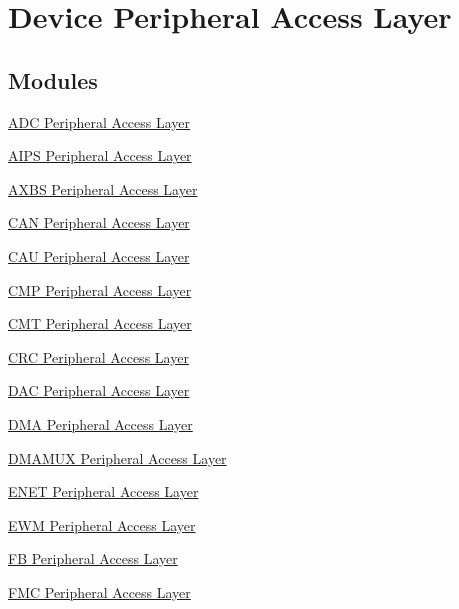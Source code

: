 \hypertarget{group__Peripheral__access__layer}{}\section{Device Peripheral Access Layer}
\label{group__Peripheral__access__layer}
\subsection*{Modules}
\begin{DoxyCompactItemize}
\item 
\hyperlink{group__ADC__Peripheral__Access__Layer}{A\+D\+C Peripheral Access Layer}
\item 
\hyperlink{group__AIPS__Peripheral__Access__Layer}{A\+I\+P\+S Peripheral Access Layer}
\item 
\hyperlink{group__AXBS__Peripheral__Access__Layer}{A\+X\+B\+S Peripheral Access Layer}
\item 
\hyperlink{group__CAN__Peripheral__Access__Layer}{C\+A\+N Peripheral Access Layer}
\item 
\hyperlink{group__CAU__Peripheral__Access__Layer}{C\+A\+U Peripheral Access Layer}
\item 
\hyperlink{group__CMP__Peripheral__Access__Layer}{C\+M\+P Peripheral Access Layer}
\item 
\hyperlink{group__CMT__Peripheral__Access__Layer}{C\+M\+T Peripheral Access Layer}
\item 
\hyperlink{group__CRC__Peripheral__Access__Layer}{C\+R\+C Peripheral Access Layer}
\item 
\hyperlink{group__DAC__Peripheral__Access__Layer}{D\+A\+C Peripheral Access Layer}
\item 
\hyperlink{group__DMA__Peripheral__Access__Layer}{D\+M\+A Peripheral Access Layer}
\item 
\hyperlink{group__DMAMUX__Peripheral__Access__Layer}{D\+M\+A\+M\+U\+X Peripheral Access Layer}
\item 
\hyperlink{group__ENET__Peripheral__Access__Layer}{E\+N\+E\+T Peripheral Access Layer}
\item 
\hyperlink{group__EWM__Peripheral__Access__Layer}{E\+W\+M Peripheral Access Layer}
\item 
\hyperlink{group__FB__Peripheral__Access__Layer}{F\+B Peripheral Access Layer}
\item 
\hyperlink{group__FMC__Peripheral__Access__Layer}{F\+M\+C Peripheral Access Layer}
\item 

\end{DoxyCompactItemize}
